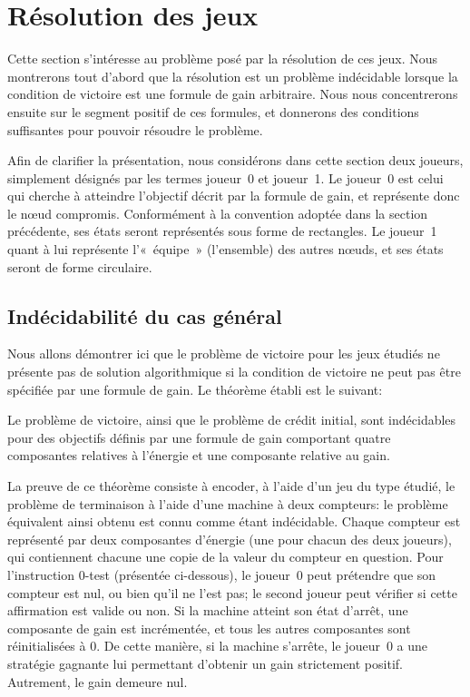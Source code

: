 \section{Résolution des jeux}
\label{tj:sec:algo}

Cette section s'intéresse au problème posé par la résolution de ces jeux.
Nous montrerons tout d'abord que la résolution est un problème indécidable lorsque la condition de victoire est une formule de gain arbitraire.
Nous nous concentrerons ensuite sur le segment positif de ces formules, et donnerons des conditions suffisantes pour pouvoir résoudre le problème.

\newcommand\jo{joueur~0\xspace}
\newcommand\ji{joueur~1\xspace}
Afin de clarifier la présentation, nous considérons dans cette section deux joueurs, simplement désignés par les termes \jo et \ji.
Le \jo est celui qui cherche à atteindre l'objectif décrit par la formule de gain, et représente donc le nœud compromis.
Conformément à la convention adoptée dans la section précédente, ses états seront représentés sous forme de rectangles.
Le \ji quant à lui représente l'« équipe » (l'ensemble) des autres nœuds, et ses états seront de forme circulaire.

\subsection{Indécidabilité du cas général}

Nous allons démontrer ici que le problème de victoire pour les jeux étudiés ne présente pas de solution algorithmique si la condition de victoire ne peut pas être spécifiée par une formule de gain.
Le théorème établi est le suivant:
\begin{theorem}
Le problème de victoire, ainsi que le problème de crédit initial, sont indécidables pour des objectifs définis par une formule de gain comportant quatre composantes relatives à l'énergie et une composante relative au gain.
\end{theorem}

La preuve de ce théorème consiste à encoder, à l'aide d'un jeu du type étudié, le problème de terminaison à l'aide d'une machine à deux compteurs: le problème équivalent ainsi obtenu est connu comme étant indécidable\cite{minsky67}.
Chaque compteur est représenté par deux composantes d'énergie (une pour chacun des deux joueurs), qui contiennent chacune une copie de la valeur du compteur en question.
Pour l'instruction $0$-test (présentée ci-dessous), le \jo peut prétendre que son compteur est nul, ou bien qu'il ne l'est pas; le second joueur peut vérifier si cette affirmation est valide ou non.
Si la machine atteint son état d'arrêt, une composante de gain est incrémentée, et tous les autres composantes sont réinitialisées à $0$.
De cette manière, si la machine s'arrête, le \jo a une stratégie gagnante lui permettant d'obtenir un gain strictement positif.
Autrement, le gain demeure nul.


